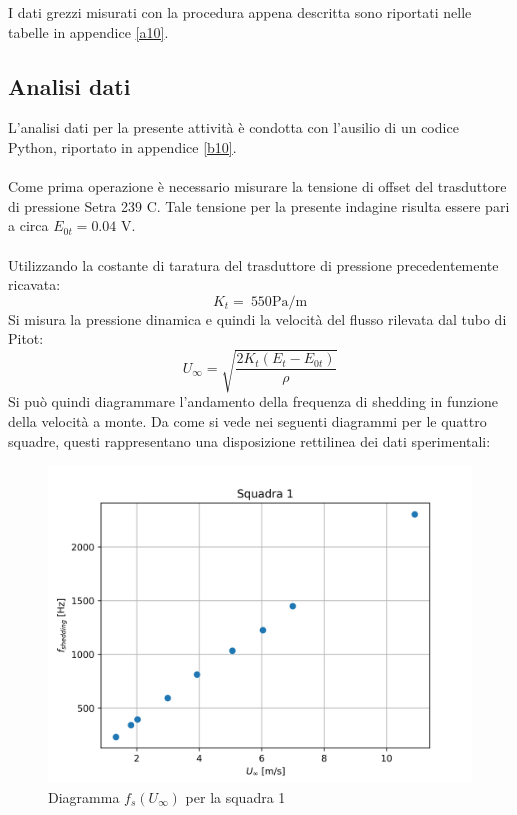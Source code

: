 \noindent I dati grezzi misurati con la procedura appena descritta sono riportati nelle tabelle in appendice \ref{a10}.

\subsection{Analisi dati}
L'analisi dati per la presente attività è condotta con l'ausilio di un codice Python, riportato in appendice \ref{b10}.\\\\
Come prima operazione è necessario misurare la tensione di offset del trasduttore di pressione Setra 239 C. Tale tensione per la presente indagine risulta essere pari a circa $E_{0t}=0.04$ V.\\\\
Utilizzando la costante di taratura del trasduttore di pressione precedentemente ricavata:
\begin{equation*}
    K_t =\ 550 \text{Pa/m}
\end{equation*}
Si misura la pressione dinamica e quindi la velocità del flusso rilevata dal tubo di Pitot:
\begin{equation*}
    U_{\infty} = \sqrt{\frac{2K_t(E_{t}-E_{0t})}\rho}
\end{equation*}
Si può quindi diagrammare l'andamento della frequenza di shedding in funzione della velocità a monte. Da come si vede nei seguenti diagrammi per le quattro squadre, questi rappresentano una disposizione rettilinea dei dati sperimentali:
\begin{figure}[H]
    \centering
    \includegraphics[width=.9\textwidth]{images/10/sq1.png}
    \caption{Diagramma $f_s(U_\infty)$ per la squadra 1}
\end{figure}
